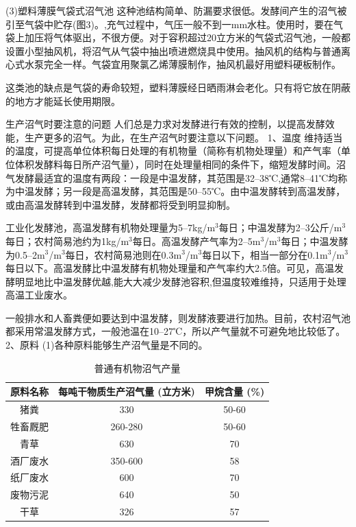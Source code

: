 \documentclass{ctexbook}
\begin{document}
(3)塑料薄膜气袋式沼气池
这种池结构简单、防漏要求很低。发酵间产生的沼气被引至气袋中贮存(图3)。,充气过程中，气压一般不到一mm水柱。使用时，要在气袋上加压将气体驱出，不很方便。对于容积超过20立方米的气袋式沼气池，一般都设置小型抽风机，将沼气从气袋中抽出喷进燃烧具中使用。抽风机的结构与普通离心式水泵完全一样。气袋宜用聚氯乙烯薄膜制作，抽风机最好用塑料硬板制作。

这类池的缺点是气袋的寿命较短，塑料薄膜经日晒雨淋会老化。只有将它放在阴蔽的地方才能延长使用期限。

生产沼气时要注意的问题
人们总是力求对发酵进行有效的控制，以提高发酵效能，生产更多的沼气。为此，在生产沼气时要注意以下问题。
1、温度	
维持适当的温度，可提高单位体积每日处理的有机物量（简称有机物处理量）和产气率（单位体积发酵料每日所产沼气量），同时在处理量相同的条件下，缩短发酵时间。沼气发酵最适宜的温度有两段：一段是中温发酵，其范围是32--38℃,通常8--41℃均称为中温发酵；另一段是高温发酵，其范围是50--55℃。由中温发酵转到高温发酵，或由高温发酵转到中温发酵，发酵都将受到明显抑制。

工业化发酵池，高温发酵有机物处理量为5--7kg/m$^3$每日；中温发酵为2--3公斤/m$^3$每日；农村简易池约为1kg/m$^3$每日。高温发酵产气率为2--5m$^3$/m$^3$每日；中温发酵为0.5--2m$^3$/m$^3$每日，农村简易池则在0.3m$^3$/m$^3$每日以下，相当一部分在0.1m$^3$/m$^3$每日以下。高温发酵比中温发酵有机物处理量和产气率约大2.5倍。可见，高温发酵明显地比中温发酵优越,能大大减少发酵池容积,但温度较难维持，只适用于处理高温工业废水。

一般排水和人畜粪便如要达到中温发酵，则发酵液要进行加热。目前，农村沼气池都采用常温发酵方式，一般池温在10--27℃，所以产气量就不可避免地比较低了。
2、原料
(1)各种原料能够生产沼气量是不同的。

\begin{table}[htbp]
	\centering
	\caption{普通有机物沼气产量}
	\begin{tabular}{c|c|c}
				\hline
		原料名称  & 每吨干物质生产沼气量 (立方米) & 甲烷含量 (\%) \\ \hline
		猪粪    & 330   & 50-60 \\ \hline
		牲畜厩肥  & 260-280 & 50-60 \\ \hline
		青草    & 630   & 70 \\ \hline
		酒厂废水  & 350-600 & 58 \\ \hline
		纸厂废水  & 600   & 70 \\ \hline
		废物污泥  & 640   & 50 \\ \hline
		干草    & 326   & 57 \\
				\hline
	\end{tabular}%
	\label{tab:zhaoqichanliang}%
\end{table}%
\end{document}
